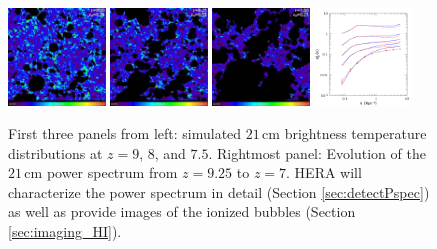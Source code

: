 \documentclass[preprint]{aastex}
\begin{document}
\begin{figure}[!ht]\centering
\includegraphics[width=0.23\textwidth]{plots/Pspec/z9sim.pdf}
\includegraphics[width=0.23\textwidth]{plots/Pspec/z8sim.pdf}
\includegraphics[width=0.23\textwidth]{plots/Pspec/z75sim.pdf}
\includegraphics[width=0.23\textwidth]{plots/Pspec/pspecEvolve.pdf}
\caption{\small 
First three panels from left: simulated $21\,\textrm{cm}$ brightness temperature distributions at $z=9$, $8$, and $7.5$.  Rightmost panel: Evolution of the $21\,\textrm{cm}$ power spectrum from $z=9.25$ to $z=7$.  HERA will characterize the power spectrum in detail (Section \ref{sec:detectPspec}) as well as provide images of the ionized bubbles (Section \ref{sec:imaging_HI}).
}\label{fig:EoRsims} \end{figure}
\end{document}
